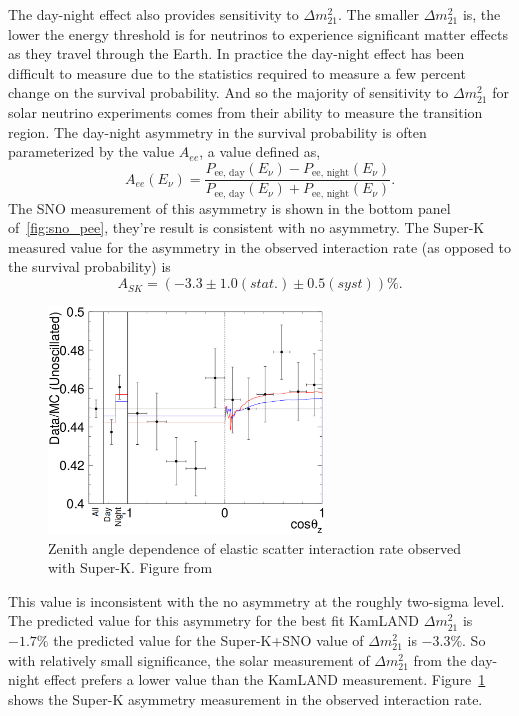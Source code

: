 The day-night effect also provides sensitivity to $\Delta m^{2}_{21}$.
The smaller $\Delta m^{2}_{21}$ is, the lower the energy threshold is for
neutrinos to experience significant matter effects as they travel through the
Earth.
In practice the day-night effect has been difficult to measure due to
the statistics required to measure a few percent change on the survival
probability.
And so the majority of sensitivity to $\Delta m^{2}_{21}$ for solar neutrino
experiments comes from their ability to measure the transition region.
The day-night asymmetry in the survival probability is often parameterized by the value $A_{ee}$, a value
defined as,
\begin{equation}
    A_{ee}(E_\nu) = \frac{P_{\text{ee, day}}(E_\nu) - P_{\text{ee, night}}(E_\nu)}{P_{\text{ee, day}}(E_\nu) + P_{\text{ee, night}}(E_\nu)}\text{.}
\end{equation}
The SNO measurement of this asymmetry is shown in the bottom panel of~\ref{fig:sno_pee},
they're result is consistent with no asymmetry.
The Super-K measured value for the asymmetry in the observed interaction rate (as opposed to
the survival probability) is
\begin{equation*}
    A_{SK} = (-3.3 \pm 1.0(stat.)\pm 0.5(syst))\%\text{.} 
\end{equation*}

\begin{figure}[htbp]
    \centering
    \includegraphics[width=0.65\textwidth]{sk_daynight}
    \caption[Super-K Day Night Asymmetry Measurement]{Zenith angle dependence of elastic scatter interaction rate observed with Super-K. Figure from~\citep{superk4}}
    \label{fig:sk_daynight}
\end{figure}

This value is inconsistent with the no asymmetry at the roughly two-sigma level.
The predicted value for this asymmetry for the best fit KamLAND $\Delta m^{2}_{21}$
is $-1.7\%$ the predicted value for the Super-K+SNO value of $\Delta m^{2}_{21}$ is
$-3.3\%$.%
So with relatively small significance, the solar measurement of $\Delta m^{2}_{21}$ from the day-night effect
prefers a lower value than the KamLAND measurement.
Figure~\ref{fig:sk_daynight} shows the Super-K asymmetry measurement in the
observed interaction rate.

